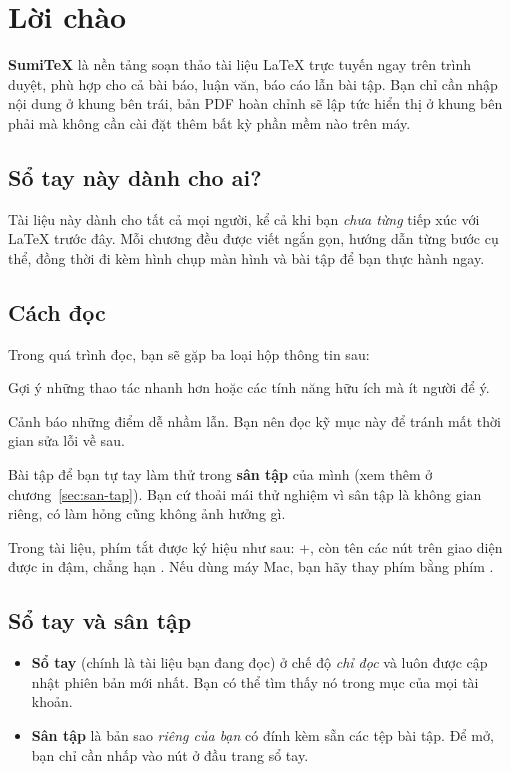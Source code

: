 \section{Lời chào}

\textbf{SumiTeX} là nền tảng soạn thảo tài liệu \LaTeX{} trực tuyến ngay trên
trình duyệt, phù hợp cho cả bài báo, luận văn, báo cáo lẫn bài tập. Bạn chỉ cần
nhập nội dung ở khung bên trái, bản PDF hoàn chỉnh sẽ lập tức hiển thị ở khung
bên phải mà không cần cài đặt thêm bất kỳ phần mềm nào trên máy.

\subsection*{Sổ tay này dành cho ai?}
Tài liệu này dành cho tất cả mọi người, kể cả khi bạn \emph{chưa từng} tiếp xúc
với \LaTeX{} trước đây. Mỗi chương đều được viết ngắn gọn, hướng dẫn từng bước
cụ thể, đồng thời đi kèm hình chụp màn hình và bài tập để bạn thực hành ngay.

\subsection*{Cách đọc}
Trong quá trình đọc, bạn sẽ gặp ba loại hộp thông tin sau:

\begin{meo}
Gợi ý những thao tác nhanh hơn hoặc các tính năng hữu ích mà ít người để ý.
\end{meo}

\begin{chuy}
Cảnh báo những điểm dễ nhầm lẫn. Bạn nên đọc kỹ mục này để tránh mất thời gian
sửa lỗi về sau.
\end{chuy}

\begin{thuchanh}
Bài tập để bạn tự tay làm thử trong \textbf{sân tập} của mình (xem thêm ở
chương~\ref{sec:san-tap}). Bạn cứ thoải mái thử nghiệm vì sân tập là không gian
riêng, có làm hỏng cũng không ảnh hưởng gì.
\end{thuchanh}

Trong tài liệu, phím tắt được ký hiệu như sau: +, còn tên
các nút trên giao diện được in đậm, chẳng hạn . Nếu dùng máy Mac,
bạn hãy thay phím  bằng phím .

\subsection*{Sổ tay và sân tập}
\begin{itemize}
  \item \textbf{Sổ tay} (chính là tài liệu bạn đang đọc) ở chế độ \emph{chỉ
    đọc} và luôn được cập nhật phiên bản mới nhất. Bạn có thể tìm thấy nó trong
    mục  của mọi tài khoản.
  \item \textbf{Sân tập} là bản sao \emph{riêng của bạn} có đính kèm sẵn các
    tệp bài tập. Để mở, bạn chỉ cần nhấp vào nút  ở đầu
    trang sổ tay.
\end{itemize}